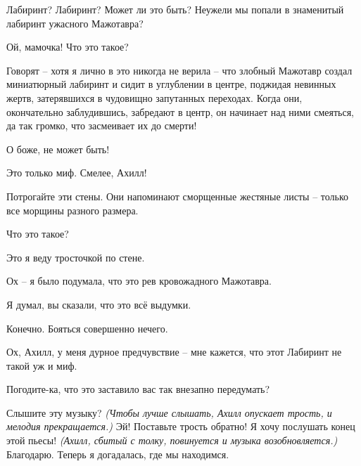 \documentclass[../main.tex]{subfiles}
\begin{document}
\begin{Dialogue}
\begin{sublevel}
\begin{sublevel}
\begin{sublevel}
 Лабиринт? Лабиринт? Может ли это быть? Неужели мы попали в знаменитый лабиринт ужасного Мажотавра?

 Ой, мамочка! Что это такое?

 Говорят \--- хотя я лично в это никогда не верила \--- что злобный Мажотавр создал миниатюрный лабиринт и сидит в углублении в центре, поджидая невинных жертв, затерявшихся в чудовищно запутанных переходах. Когда они, окончательно заблудившись, забредают в центр, он начинает над ними смеяться, да так громко, что засмеивает их до смерти!

 О боже, не может быть!

 Это только миф. Смелее, Ахилл!


 Потрогайте эти стены. Они напоминают сморщенные жестяные листы \--- только все морщины разного размера.


 Что это такое?

 Это я веду тросточкой по стене.

 Ох \--- я было подумала, что это рев кровожадного Мажотавра.

 Я думал, вы сказали, что это всё выдумки.

 Конечно. Бояться совершенно нечего.


 Ох, Ахилл, у меня дурное предчувствие \--- мне кажется, что этот Лабиринт не такой уж и миф.

 Погодите-ка, что это заставило вас так внезапно передумать?

 Слышите эту музыку? \emph{(Чтобы лучше слышать, Ахилл опускает трость, и мелодия прекращается.)} Эй! Поставьте трость обратно! Я хочу послушать конец этой пьесы! \emph{(Ахилл, сбитый с толку, повинуется и музыка возобновляется.)} Благодарю. Теперь я догадалась, где мы находимся.


\end{sublevel}
\end{sublevel}
\end{sublevel}
\end{Dialogue}
\end{document}
